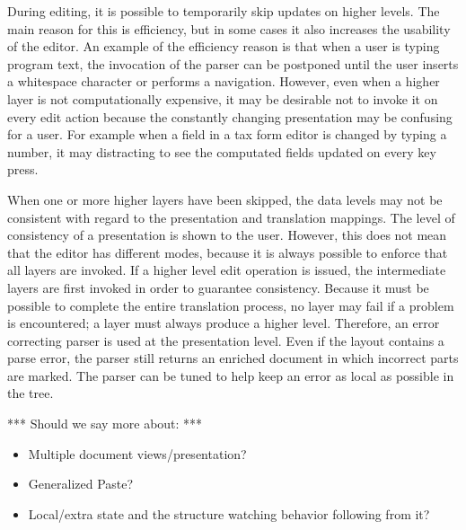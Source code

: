 During editing, it is possible to temporarily skip updates on higher levels. The main reason for this is efficiency, but in some cases it also increases the usability of the editor. An example of the efficiency reason is that when a user is typing program text, the invocation of the parser can be postponed until the user inserts a whitespace character or performs a navigation. However, even when a higher layer is not computationally expensive, it may be desirable not to invoke it on every edit action because the constantly changing presentation may be confusing for a user. For example when a field in a tax form editor is changed by typing a number, it may distracting to see the computated fields updated on every key press.

When one or more higher layers have been skipped, the data levels may not be consistent with regard to the presentation and translation mappings. The level of consistency of a presentation is shown to the user. However, this does not mean that the editor has different modes, because it is always possible to enforce that all layers are invoked. If a higher level edit operation is issued, the intermediate layers are first invoked in order to guarantee consistency. Because it must be possible to complete the entire translation process, no layer may fail if a problem is encountered; a layer must always produce a higher level. Therefore, an error correcting parser is used at the presentation level. Even if the layout contains a parse error, the parser still returns an enriched document in which incorrect parts are marked. The parser can be tuned to help keep an error as local as possible in the tree.

 


*** Should we say more about: ***
\begin{itemize}
\item Multiple document views/presentation?
\item Generalized Paste?
\item Local/extra state and the structure watching behavior following from it?
\end{itemize}





